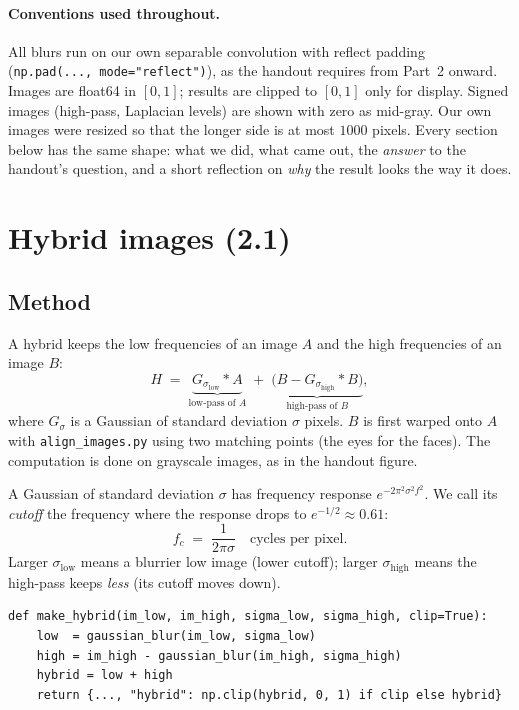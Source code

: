 \documentclass[11pt,a4paper]{article}
\newcommand{\sig}{\sigma}
\newcommand{\fc}{f_c}
\begin{document}
\paragraph{Conventions used throughout.}
All blurs run on our own separable convolution with reflect padding (\texttt{np.pad(..., mode="reflect")}), as the
handout requires from Part~2 onward. Images are float64 in $[0,1]$; results are clipped to $[0,1]$ only for display.
Signed images (high-pass, Laplacian levels) are shown with zero as mid-gray. Our own images were resized so that the longer side is at most $1000$ pixels. Every section below has the same shape:
what we did, what came out, the \emph{answer} to the handout's question, and a short reflection on \emph{why} the
result looks the way it does.

\section{Hybrid images (2.1)}

\subsection{Method}
A hybrid keeps the low frequencies of an image $A$ and the high frequencies of an image $B$:
\begin{equation}
  H \;=\; \underbrace{G_{\sig_{\text{low}}} * A}_{\text{low-pass of }A}\;+\;\underbrace{\bigl(B - G_{\sig_{\text{high}}} * B\bigr)}_{\text{high-pass of }B},
\end{equation}
where $G_\sigma$ is a Gaussian of standard deviation $\sigma$ pixels. $B$ is first warped onto $A$ with
\texttt{align\_images.py} using two matching points (the eyes for the faces). The computation is done on grayscale
images, as in the handout figure.

A Gaussian of standard deviation $\sigma$ has frequency response $e^{-2\pi^2\sigma^2 f^2}$. We call its \emph{cutoff}
the frequency where the response drops to $e^{-1/2}\approx0.61$:
\begin{equation}
  \fc \;=\; \frac{1}{2\pi\sigma}\quad\text{cycles per pixel.}
\end{equation}
Larger $\sigma_{\text{low}}$ means a blurrier low image (lower cutoff); larger $\sigma_{\text{high}}$ means the high-pass
keeps \emph{less} (its cutoff moves down).

\begin{lstlisting}
def make_hybrid(im_low, im_high, sigma_low, sigma_high, clip=True):
    low  = gaussian_blur(im_low, sigma_low)
    high = im_high - gaussian_blur(im_high, sigma_high)
    hybrid = low + high
    return {..., "hybrid": np.clip(hybrid, 0, 1) if clip else hybrid}
\end{lstlisting}
\end{document}
